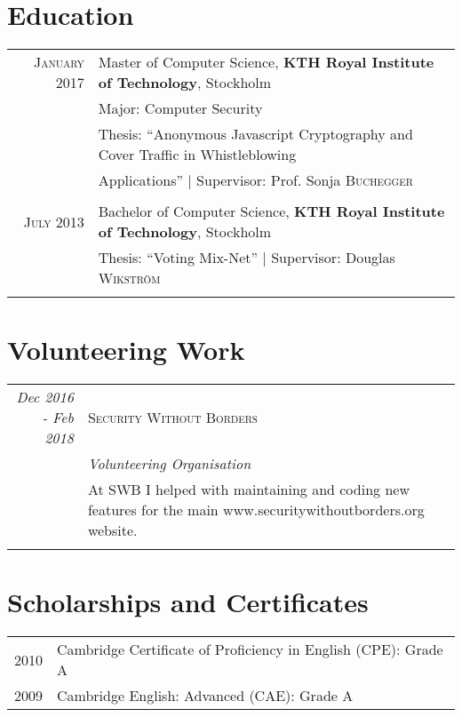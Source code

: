 \documentclass[a4paper,10pt]{article}
\begin{document}
\section{Education}
\begin{tabular}{rl}	
 \textsc{January} 2017 & Master of Computer Science, \textbf{KTH Royal Institute of Technology}, Stockholm\\
&Major: Computer Security\\
& Thesis: ``Anonymous Javascript Cryptography and Cover Traffic in Whistleblowing\\& Applications'' | \small Supervisor: Prof. Sonja \textsc{Buchegger}\\ \\

\textsc{July} 2013 & Bachelor of Computer Science, \textbf{KTH Royal Institute of Technology}, Stockholm\\
& Thesis: ``Voting Mix-Net'' | \small Supervisor: Douglas \textsc{Wikström}\\ \\
\end{tabular}

\section{Volunteering Work}
\begin{tabular}{r|p{11cm}}
 \emph{Dec 2016 - Feb 2018} & \textsc{Security Without Borders} \\
 \textsc{}&\emph{Volunteering Organisation}\\
 &\footnotesize{At SWB I helped with maintaining and coding new features for the main www.securitywithoutborders.org website.} \\ \multicolumn{2}{c}{} \\
 
\end{tabular}

\section{Scholarships and Certificates}
\begin{tabular}{rl}
 \textsc{2010} & Cambridge Certificate of Proficiency in English (CPE): Grade A \\
\textsc{2009} & Cambridge English: Advanced (CAE): Grade A
\end{tabular}
\end{document}
